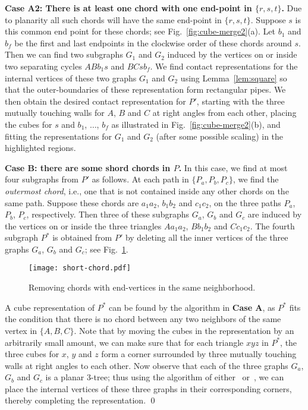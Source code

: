 \documentclass{llncs}
\renewenvironment{proof}{\medskip\noindent{\bf Proof:}}{\mbox{}\hfill\qed\par}
\begin{document}
\begin{proof}
\textbf{Case A2: There is at least one chord with one end-point in $\{r, s, t\}$.} Due to planarity
 all such chords will have the same end-point in $\{ r,s,t\}$. Suppose $s$ is this common end
 point for these chords; see Fig.~\ref{fig:cube-merge2}(a).
 Let $b_1$ and $b_f$ be the first and last endpoints in the clockwise order of these chords
 around $s$. Then we can find two subgraphs $G_1$ and $G_2$
 induced by the vertices on or inside two separating cycles $ABb_1s$ and $BCsb_f$. We
 find contact representations for the internal vertices of these two graphs $G_1$ and $G_2$
 using Lemma~\ref{lem:square} so that the outer-boundaries of these representation form
 rectangular pipes. We then obtain the desired contact representation for $P'$, starting with the
 three mutually touching walls for $A$, $B$ and $C$ at right angles
 from each other, placing
 the cubes for $s$ and $b_1$, $\ldots$, $b_f$ as illustrated in
 Fig.~\ref{fig:cube-merge2}(b), and fitting the representations for $G_1$ and $G_2$ (after some
 possible scaling) in the highlighted regions.






\smallskip\noindent
\textbf{Case B: there are some shord chords in $P$.}
 In this case, we find at most four subgraphs from $P'$ as follows. At each path in
 $\{ P_a, P_b, P_c\}$, we find the \textit{outermost chord},
 i.e., one that is not contained inside any other chords on the same path.
 Suppose these chords are $a_1a_2$,
 $b_1b_2$ and $c_1c_2$, on the three paths $P_a$, $P_b$, $P_c$, respectively.
 Then three of these subgraphs $G_a$, $G_b$ and $G_c$ are  induced by the vertices
 on or inside the three
triangles $Aa_1a_2$, $Bb_1b_2$ and $Cc_1c_2$.
 The fourth subgraph $P^*$ is obtained from $P'$ by deleting all the inner
 vertices of the three graphs $G_a$, $G_b$ and $G_c$; see Fig.~\ref{fig:short-chord}.

\begin{figure}[t]
\centering
	\texttt{[image: short-chord.pdf]}
	\caption{Removing chords with end-vertices in the same neighborhood.}
	\label{fig:short-chord}
\end{figure}


 A cube representation of $P^*$ can be found by the algorithm in \textbf{Case A}, as $P^*$
 fits the condition that there is no chord between any two neighbors of the same vertex in
 $\{A, B, C\}$. Note that by moving the cubes in the representation by an arbitrarily
 small amount, we can make sure that for each triangle $xyz$ in $P^*$, the three cubes for $x$,
 $y$ and $z$ form a corner surrounded by three mutually touching walls at right angles to
 each other. Now observe that each of the three graphs $G_a$, $G_b$ and $G_c$ is a planar
 3-tree; thus using the algorithm of either~\cite{BEF+12} or~\cite{FF11}, we can
 place the internal vertices of these three graphs in their corresponding corners, thereby
 completing the representation.
\end{proof}
\end{document}
